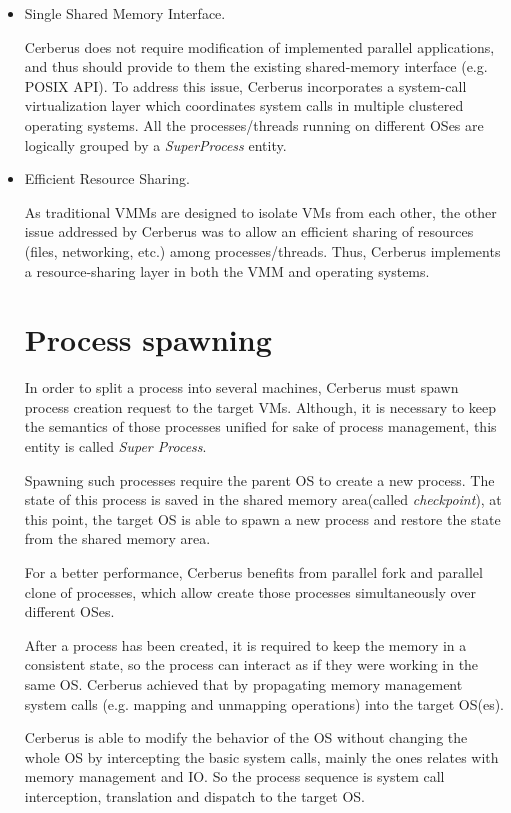 \documentclass[journal]{IEEEtran}
\begin{document}
\begin{itemize}
  \item Single Shared Memory Interface.

    Cerberus does not require modification of implemented parallel
    applications, and thus should provide to them the existing
    shared-memory interface (e.g. POSIX API). To address this issue,
    Cerberus incorporates a system-call virtualization layer which
    coordinates system calls in multiple clustered operating systems.
    All the processes/threads running on different OSes are logically
    grouped by a \emph{SuperProcess} entity.

  \item Efficient Resource Sharing.

   As traditional VMMs are designed to isolate VMs from each other, the
   other issue addressed by Cerberus was to allow an efficient sharing
   of resources (files, networking, etc.) among processes/threads. Thus,
   Cerberus implements a resource-sharing layer in both the VMM and
   operating systems.

	\section{Process spawning} 
	
	In order to split a process into several machines, Cerberus must spawn process creation request to the target VMs. Although, it is necessary to keep the semantics of those processes unified for sake of process management, this entity is called \emph{Super Process}.
	
	Spawning such processes require the parent OS to create a new process. The state of this process is saved in the shared memory area(called \emph{checkpoint}), at this point, the target OS is able to spawn a new process and restore the state from the shared memory area. 
	
	For a better performance, Cerberus benefits from parallel fork and parallel clone of processes, which allow create those processes simultaneously over different OSes.	

	After a process has been created, it is required to keep the memory in a consistent state, so the process can interact as if they were working in the same OS. Cerberus achieved that by propagating memory management system calls (e.g. mapping and unmapping operations) into the target OS(es).
	
	Cerberus is able to modify the behavior of the OS without changing the whole OS by intercepting the basic system calls, mainly the ones relates with memory management and IO. So the process sequence is system call interception, translation and dispatch to the target OS. %
	

\end{itemize}
\end{document}
